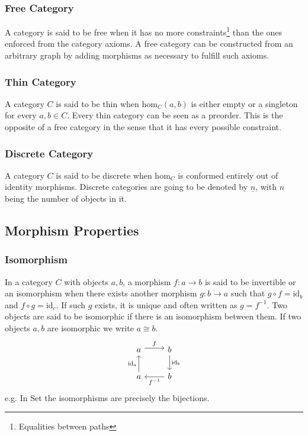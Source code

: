 \subsubsection*{Free Category}
A category is said to be free when it has no more
constraints\footnote{Equalities between paths} than the ones enforced from the
category axioms. \parencite{adamek_herrlich_strecker:joy_cats} A free category
can be constructed from an arbitrary graph by adding morphisms as necessary to
fulfill such axioms.

\subsubsection*{Thin Category}
A category $C$ is said to be thin when $\mathrm{hom}_C(a, b)$ is either empty or
a singleton for every $a,b\in C$. \parencite{adamek_herrlich_strecker:joy_cats}
Every thin category can be seen as a preorder. This is the opposite of a free
category in the sense that it has every possible constraint.

\subsubsection*{Discrete Category}
A category $C$ is said to be discrete when $\mathrm{hom}_C$ is conformed
entirely out of identity morphisms. \parencite{awodey:category_theory} Discrete
categories are going to be denoted by $\underline{n}$, with $n$ being the number
of objects in it.

\subsection{Morphism Properties}

\subsubsection*{Isomorphism}
In a category $C$ with objects $a, b$, a morphism $f: a\to b$ is said to be
invertible or an isomorphism when there exists another morphism $g:b \to a$ such
that $g\circ f = \mathrm{id}_b$ and $f\circ g = \mathrm{id}_c$.
\parencite{maclane:working_mathematician}
If such $g$ exists, it is unique and often written as $g= f^{-1}$. Two objects
are said to be isomorphic if there is an isomorphism between them. If two
objects $a,b$ are isomorphic we write $a\cong b$.
\[\begin{tikzcd}
	a & b \\
	a & b
	\arrow["f", shift left=1, from=1-1, to=1-2]
	\arrow["{f^{-1}}", from=2-2, to=2-1]
	\arrow["{\mathrm{id}_a}", from=2-1, to=1-1]
	\arrow["{\mathrm{id}_b}", from=1-2, to=2-2]
\end{tikzcd}\]
e.g. In Set the isomorphisms are precisely the bijections.

